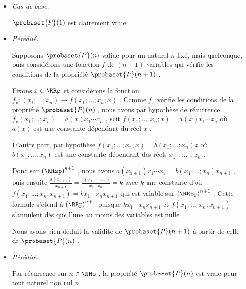 \begin{itemize}[label=\small\textbullet]
	\item \emph{Cas de base.}
	
	\noindent
	$\probaset{P}(1)$ est clairement vraie.


	\medskip
	\item \emph{Hérédité.}
	
	\noindent
	Supposons $\probaset{P}(n)$ valide pour un naturel $n$ fixé, mais quelconque, puis considérons une fonction $f$ de $(n + 1)$ variables qui vérifie les conditions de la propriété $\probaset{P}(n + 1)$ .
	
	\smallskip
	\noindent
	Fixons $x \in \RRp$ et considérons la fonction $f_x : (x_1 ; ... ; x_n) \rightarrow f(x_1 ; ... ; x_n ; x)$ .
	Comme $f_x$  vérifie les conditions de la propriété $\probaset{P}(n)$ ,
	nous avons par hypothèse de récurrence 
	$f_x(x_1 ; ... ; x_n) = a(x) x_1 \cdots x_n$ , soit $f(x_1 ; ... ; x_n ; x) = a(x) x_1 \cdots x_n$ où $a(x)$ est une constante dépendant du réel $x$ .
	
	\smallskip
	\noindent
	D'autre part, par hypothèse $f(x_1 ; ... ; x_n ; x) = b(x_1 ; ... ; x_n) x$ où $b(x_1 ; ... ; x_n)$ est une constante dépendant des réels $x_1$ , ... , $x_n$ .
	
	\smallskip
	\noindent
	Donc sur $\left( \RRsp \right)^{n+1}$ , nous avons
	$a(x_{n+1}) x_1 \cdots x_n = b(x_1 ; ... ; x_n) x_{n+1}$ ,
	puis ensuite
	$\frac{a(x_{n+1})}{x_{n+1}} = \frac{b(x_1 ; ... ; x_n)}{x_1 \cdots x_n} = k$
	avec $k$ une constante d'où
	$f(x_1 ; ... ; x_n ; x_{n+1}) = k x_1 \cdots x_n x_{n+1}$
	qui est valable sur $\left( \RRsp \right)^{n+1}$ .
	Cette formule s'étend à $\left( \RRp \right)^{n+1}$ puisque
	$k x_1 \cdots x_n x_{n+1}$ et $f(x_1 ; ... ; x_n ; x_{n+1})$ s'annulent dès que l'une au moins des variables est nulle.
	
	\smallskip
	\noindent
	Nous avons bien déduit la validité de $\probaset{P}(n+1)$ à partir de celle de $\probaset{P}(n)$ .


	\medskip
	\item \emph{Hérédité.}
	
	\smallskip
	\noindent
	Par récurrence sur $n \in \NNs$ , la propriété $\probaset{P}(n)$ est vraie pour tout naturel non nul $n$ .
\end{itemize} 


